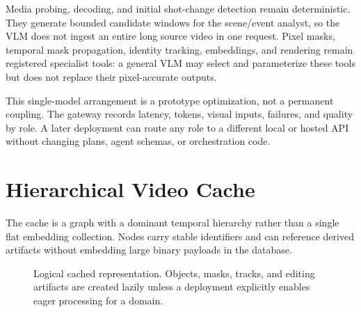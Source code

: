 \documentclass[11pt]{article}
\begin{document}
Media probing, decoding, and initial shot-change detection remain deterministic.
They generate bounded candidate windows for the scene/event analyst, so the VLM
does not ingest an entire long source video in one request. Pixel masks, temporal
mask propagation, identity tracking, embeddings, and rendering remain registered
specialist tools: a general VLM may select and parameterize these tools but does
not replace their pixel-accurate outputs.

This single-model arrangement is a prototype optimization, not a permanent
coupling. The gateway records latency, tokens, visual inputs, failures, and
quality by role. A later deployment can route any role to a different local or
hosted API without changing plans, agent schemas, or orchestration code.

\section{Hierarchical Video Cache}

The cache is a graph with a dominant temporal hierarchy rather than a single
flat embedding collection. Nodes carry stable identifiers and can reference
derived artifacts without embedding large binary payloads in the database.

\begin{figure}[H]
\centering
{}
\caption{Logical cached representation. Objects, masks, tracks, and editing
artifacts are created lazily unless a deployment explicitly enables eager
processing for a domain.}
\label{fig:hierarchy}
\end{figure}
\end{document}

